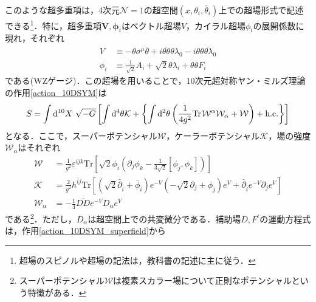 \documentclass[a4paper,uplatex,dvipdfmx]{jsarticle}
\theoremstyle{definition}
\begin{document}
このような超多重項は，4次元$\mathcal{N}=1$の超空間$(x,\theta_{i},\bar{\theta}_{i})$上での超場形式で記述できる\footnote{
   超場のスピノルや超場の記法は，教科書\cite{Wess_SupersymmetrySupergravity_1992}の記述に主に従う．
}．特に，超多重項$\bm{V},\bm{\phi}_{i}$はベクトル超場$V$，カイラル超場$\phi_{i}$の展開係数に現れ，それぞれ
\begin{align}
   V
   &\equiv
   -
   \theta\sigma^{\mu}\bar{\theta}
   +
   i\overline{\theta\theta}\theta\lambda_{0}
   -
   i\theta\theta\overline{\theta\lambda}_{0}
   \nonumber
   \\
   \phi_{i}
   &\equiv
   \frac{1}{\sqrt{2}}A_{i}
   +
   \sqrt{2}\theta\lambda_{i}
   +
   \theta\theta F_{i}
   \nonumber
\end{align}
である(WZゲージ)．この超場を用いることで，10次元超対称ヤン・ミルズ理論の作用\eqref{action_10DSYM}は
\begin{equation}
   S
   =
   \int\dd^{10} X\ \sqrt{-G}
   \left[  
      \int\dd^4\theta
      \mathcal{K}
      +
      \left\{  
         \int\dd^2\theta
         \left(  
            \frac{1}{4g^2}\text{Tr\hspace*{1pt}}\mathcal{W^{\alpha}\mathcal{W}_{\alpha}}
            +
            \mathcal{W}
         \right)
         +
         \text{h.c.}
      \right\}
   \right]
   \label{action_10DSYM_superfield}
\end{equation}
となる\cite{Arkani-Hamed_HigherDimensional_2002}．ここで，スーパーポテンシャル$\mathcal{W}$，ケーラーポテンシャル$\mathcal{K}$，場の強度$\mathcal{W}_{\alpha}$はそれぞれ
\begin{align}
   \mathcal{W}
   &=
   \frac{1}{g^2}\varepsilon^{ijk}\text{Tr}
   \left[  
      \sqrt{2}\phi_{i}
      \left(  
         \partial_{j}\phi_{k}
         -
         \frac{1}{3\sqrt{2}}[\phi_{j},\phi_{k}]
      \right)
   \right]
   \nonumber
   \\
   \mathcal{K}
   &=
   \frac{2}{g^2}h^{\bar{i}j}
   \text{Tr}
   \left[  
      (\sqrt{2}\bar{\partial}_{\bar{i}}+\bar{\phi}_{\bar{i}})e^{-V}
      (-\sqrt{2}\partial_{j}+\phi_{j})e^{V}
      +
      \bar{\partial}_{\bar{i}}e^{-V}\partial_{j}e^{V}
   \right]
   \nonumber
   \\
   \mathcal{W}_{\alpha}
   &=
   -
   \frac{1}{4}\overline{DD}e^{-V}D_{\alpha}e^{V}
   \nonumber
\end{align}
である\footnote{
   スーパーポテンシャル$\mathcal{W}$は複素スカラー場について正則なポテンシャルという特徴がある．
}．ただし，$D_{\alpha}$は超空間上での共変微分である．補助場$D,F^{i}$の運動方程式は，作用\eqref{action_10DSYM_superfield}から
\end{document}
